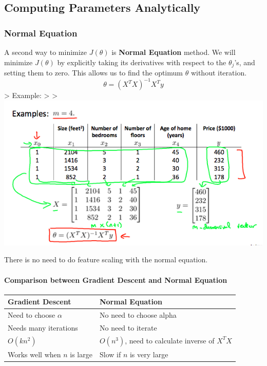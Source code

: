 \documentclass[11pt]{article}
\makeatletter
\def\maxwidth{\ifdim\Gin@nat@width>\linewidth\linewidth
    \else\Gin@nat@width\fi}
\let\Oldincludegraphics\includegraphics
\renewcommand{\includegraphics}[1]{\Oldincludegraphics[width=.8\maxwidth]{#1}}
\makeatother
\begin{document}
\hypertarget{computing-parameters-analytically}{%
\subsection{Computing Parameters
Analytically}\label{computing-parameters-analytically}}

\hypertarget{normal-equation}{%
\subsubsection{Normal Equation}\label{normal-equation}}

A second way to minimize \(J(\theta)\) is \textbf{Normal Equation}
method. We will minimize \(J(\theta)\) by explicitly taking its
derivatives with respect to the \(\theta_j\)'s, and setting them to
zero. This allows us to find the optimum \(\theta\) without iteration.
\[
\theta=(X^TX)^{-1}X^Ty
\] \textgreater{} Example: \textgreater{} \textgreater{}
\includegraphics{./assets/dykma6dwEea3qApInhZCFg_333df5f11086fee19c4fb81bc34d5125_Screenshot-2016-11-10-10.06.16.png}

There is no need to do feature scaling with the normal equation.

\hypertarget{comparison-between-gradient-descent-and-normal-equation}{%
\paragraph{Comparison between Gradient Descent and Normal
Equation}\label{comparison-between-gradient-descent-and-normal-equation}}

\begin{longtable}[]{@{}ll@{}}
\toprule
Gradient Descent & Normal Equation\tabularnewline
\midrule
\endhead
Need to choose \(\alpha\) & No need to choose alpha\tabularnewline
Needs many iterations & No need to iterate\tabularnewline
\(O(kn^2)\) & \(O(n^3)\), need to calculate inverse of
\(X^TX\)\tabularnewline
Works well when \(n\) is large & Slow if \(n\) is very
large\tabularnewline
\bottomrule
\end{longtable}
\end{document}
